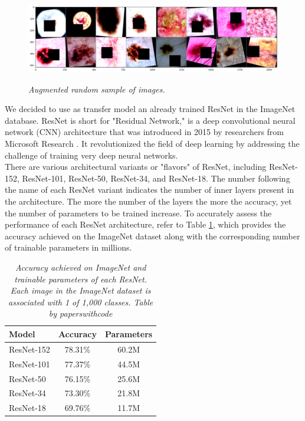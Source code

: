 \begin{figure}[H]
  \centering
  \begin{adjustbox}{width=0.9\textwidth}
  \includegraphics[width=\textwidth]{imatges/methodological_contribution/random-sample-of-isic-augmented.png}
  \end{adjustbox}
  \caption[Augmented random sample of images]{\textit{Augmented random sample of images.}}
  {\label{fig:aug-sample-of-datasets}}
\end{figure}


We decided to use as transfer model an already trained ResNet in the ImageNet
database. ResNet is short for "Residual Network," is a deep convolutional
neural network (CNN) architecture that was introduced in 2015 by researchers
from Microsoft Research \cite{ResNetPaper}. It revolutionized the field of deep
learning by addressing the challenge of training very deep neural networks. \\

There are various architectural variants or "flavors" of ResNet, including
ResNet-152,  ResNet-101,  ResNet-50,  ResNet-34, and  ResNet-18. The number
following the name of each ResNet variant indicates the number of inner layers
present in the architecture. The more the number of the layers the more the
accuracy, yet the number of parameters to be trained increase. To accurately
assess the performance of each ResNet architecture, refer to Table
\ref{table:resnet}, which provides the accuracy achieved on the ImageNet
dataset along with the corresponding number of trainable parameters in
millions.

\begin{table}[H]
  \centering
  \begin{tabular}{lcc}
    \toprule
    \textbf{Model} & \textbf{Accuracy} & \textbf{Parameters} \\
    \midrule
    ResNet-152 & 78.31\% & 60.2M \\
    ResNet-101 & 77.37\% & 44.5M \\
    ResNet-50 & 76.15\% & 25.6M \\
    ResNet-34 & 73.30\% & 21.8M \\
    ResNet-18 & 69.76\% & 11.7M \\
    \bottomrule
  \end{tabular}
  \caption[Accuracy achieved on ImageNet and trainable parameters of each ResNet]
  {\textit{Accuracy achieved on ImageNet and trainable parameters of each ResNet.
  Each image in the ImageNet dataset is associated with 1 of 1,000 classes. Table by paperswithcode}}
  {\label{table:resnet}}
\end{table}

